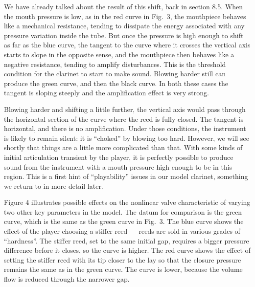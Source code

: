   We have already talked about the result of this shift, back in section 8.5. 
  When the mouth pressure is low, as in the red curve in Fig.\ 3, the 
  mouthpiece behaves like a mechanical resistance, tending to dissipate the 
  energy associated with any pressure variation inside the tube. But once the 
  pressure is high enough to shift as far as the blue curve, the tangent to the 
  curve where it crosses the vertical axis starts to slope in the opposite 
  sense, and the mouthpiece then behaves like a negative resistance, tending to 
  amplify disturbances. This is the threshold condition for the clarinet to 
  start to make sound. Blowing harder still can produce the green curve, and 
  then the black curve. In both these cases the tangent is sloping steeply and 
  the amplification effect is very strong. 

  Blowing harder and shifting a little further, the vertical axis would pass 
  through the horizontal section of the curve where the reed is fully closed. 
  The tangent is horizontal, and there is no amplification. Under those 
  conditions, the instrument is likely to remain silent: it is ``choked'' by 
  blowing too hard. However, we will see shortly that things are a little more 
  complicated than that. With some kinds of initial articulation transient by 
  the player, it is perfectly possible to produce sound from the instrument 
  with a mouth pressure high enough to be in this region. This is a first hint 
  of ``playability'' issues in our model clarinet, something we return to in 
  more detail later. 

  Figure 4 illustrates possible effects on the nonlinear valve characteristic 
  of varying two other key parameters in the model. The datum for comparison is 
  the green curve, which is the same as the green curve in Fig.\ 3. The blue 
  curve shows the effect of the player choosing a stiffer reed — reeds are sold 
  in various grades of “hardness”. The stiffer reed, set to the same initial 
  gap, requires a bigger pressure difference before it closes, so the curve is 
  higher. The red curve shows the effect of setting the stiffer reed with its 
  tip closer to the lay so that the closure pressure remains the same as in the 
  green curve. The curve is lower, because the volume flow is reduced through 
  the narrower gap. 


